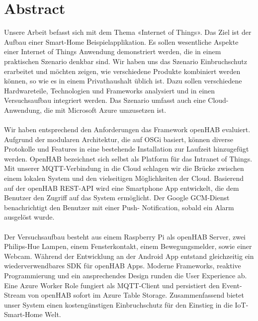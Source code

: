 
\chapter*{Abstract}
Unsere Arbeit befasst sich mit dem Thema «Internet of Things». Das Ziel ist der Aufbau einer Smart-Home Beispielapplikation. Es sollen wesentliche Aspekte einer Internet of Things Anwendung demonstriert werden, die in einem praktischen Szenario denkbar sind. Wir haben uns das Szenario Einbruchschutz erarbeitet und möchten zeigen, wie verschiedene Produkte kombiniert werden können, so wie es in einem Privathaushalt üblich ist. Dazu sollen verschiedene Hardwareteile, Technologien und Frameworks analysiert und in einen Versuchsaufbau integriert werden. Das Szenario umfasst auch eine Cloud-Anwendung, die mit Microsoft Azure umzusetzen ist.
\\ \\
Wir haben entsprechend den Anforderungen das Framework openHAB evaluiert. Aufgrund der modularen Architektur, die auf OSGi basiert, können diverse Protokolle und Features in eine bestehende Installation zur Laufzeit hinzugefügt werden. OpenHAB bezeichnet sich selbst als Platform für das Intranet of Things. Mit unserer MQTT-Verbindung in die Cloud schlagen wir die Brücke zwischen einem lokalen System und den vielseitigen Möglichkeiten der Cloud. Basierend auf der openHAB REST-API wird eine Smartphone App entwickelt, die dem Benutzer den Zugriff auf das System ermöglicht. Der Google GCM-Dienst benachrichtigt den Benutzer mit einer Push- Notification, sobald ein Alarm ausgelöst wurde.
\\ \\
Der Versuchsaufbau besteht aus einem Raspberry Pi als openHAB Server, zwei Philips-Hue Lampen, einem Fensterkontakt, einem Bewegungsmelder, sowie einer Webcam. Während der Entwicklung an der Android App entstand gleichzeitig ein wiederverwendbares SDK für openHAB Apps. Moderne Frameworks, reaktive Programmierung und ein ansprechendes Design runden die User Experience ab. Eine Azure Worker Role fungiert als MQTT-Client und persistiert den Event-Stream von openHAB sofort im Azure Table Storage. Zusammenfassend bietet unser System einen kostengünstigen Einbruchschutz für den Einstieg in die IoT-Smart-Home Welt.